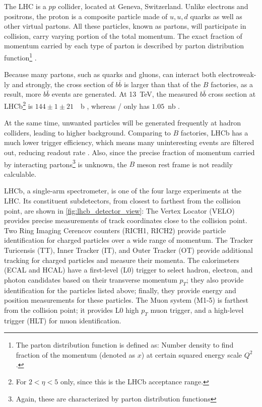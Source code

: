 The LHC is a $pp$ collider, located at Geneva, Switzerland.
Unlike electrons and positrons, the proton is a composite particle made of $u, u, d$ quarks as well as other virtual 
partons.
All these particles, known as partons, will participate in collision, carry varying portion of the total
momentum.
The exact fraction of momentum carried by each type of parton is described by 
parton distribution function\footnote{
    The parton distribution function is defined as:
    Number density to find fraction of the momentum (denoted as $x$) at certain
    squared energy scale $Q^2$.
} \cite{Ball:2014uwa}.

Because many partons, such as quarks and gluons, can interact both electroweak-ly and strongly,
the cross section of $b \bar{b}$ is larger than that of the $B$ factories, as a result, more $b \bar{b}$ events are generated.
At \SI{13}{TeV}, the measured $b \bar{b}$ cross section at LHCb\footnote{
    For $2 < \eta < 5$ only, since this is the LHCb acceptance range.
} is $144 \pm 1 \pm 21$~\si{\mu b} \cite{Aaij:2016avz}, whereas \BaBar/ only has 
$1.05$~\si{nb} \cite{Harrison:1998yr}.

At the same time, unwanted particles will be generated frequently at hadron colliders, leading to higher background.
Comparing to $B$ factories, LHCb has a much lower trigger efficiency,
which means many uninteresting events are filtered out, reducing readout
rate \cite{LHCb:2008}.
Also, since the precise fraction of momentum carried by
interacting partons\footnote{
    Again, these are characterized by parton distribution functions
} is unknown, the $B$ meson rest frame is not readily calculable.

LHCb, a single-arm spectrometer, is one of the four large experiments at the
LHC.
Its constituent subdetectors, from closest to farthest from the collision point,
are shown in \autoref{fig:lhcb_detector_view}:
The Vertex Locator (VELO) provides precise measurements of track coordinates
close to the collision point.
Two Ring Imaging Cerencov counters (RICH1, RICH2) provide particle
identification for charged particles over a wide range of momentum.
The Tracker Turicensis (TT), Inner Tracker (IT), and Outer Tracker (OT) provide additional tracking for
charged particles and measure their momenta.
The calorimeters (ECAL and HCAL) have a first-level (L0) trigger to select
hadron, electron, and photon candidates based on their transverse momentum
$p_T$;
they also provide identification for the particles listed above;
finally, they provide energy and position measurements for these particles.
The Muon system (M1-5) is farthest from the collision point;
it provides L0 high $p_T$ muon trigger, and a high-level trigger (HLT) for muon
identification.

